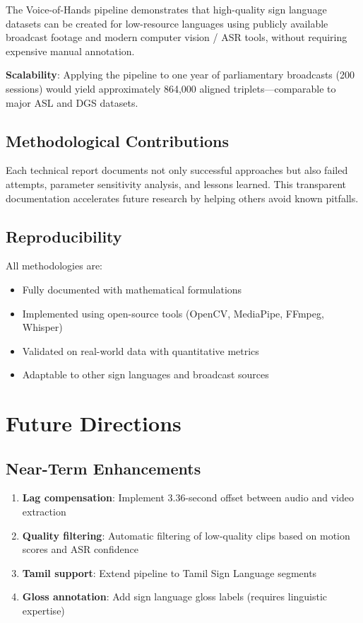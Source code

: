 \documentclass[11pt,a4paper]{article}
\begin{document}
The Voice-of-Hands pipeline demonstrates that high-quality sign language datasets can be created for low-resource languages using publicly available broadcast footage and modern computer vision / ASR tools, without requiring expensive manual annotation.

\textbf{Scalability}: Applying the pipeline to one year of parliamentary broadcasts (200 sessions) would yield approximately 864,000 aligned triplets---comparable to major ASL and DGS datasets.

\subsection{Methodological Contributions}

Each technical report documents not only successful approaches but also failed attempts, parameter sensitivity analysis, and lessons learned. This transparent documentation accelerates future research by helping others avoid known pitfalls.

\subsection{Reproducibility}

All methodologies are:
\begin{itemize}
    \item Fully documented with mathematical formulations
    \item Implemented using open-source tools (OpenCV, MediaPipe, FFmpeg, Whisper)
    \item Validated on real-world data with quantitative metrics
    \item Adaptable to other sign languages and broadcast sources
\end{itemize}

\section{Future Directions}

\subsection{Near-Term Enhancements}

\begin{enumerate}
    \item \textbf{Lag compensation}: Implement 3.36-second offset between audio and video extraction
    \item \textbf{Quality filtering}: Automatic filtering of low-quality clips based on motion scores and ASR confidence
    \item \textbf{Tamil support}: Extend pipeline to Tamil Sign Language segments
    \item \textbf{Gloss annotation}: Add sign language gloss labels (requires linguistic expertise)
\end{enumerate}
\end{document}
